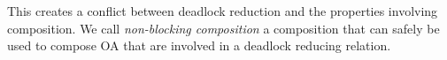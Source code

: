 \documentclass[runningheads]{llncs}
\begin{document}
This creates a conflict between deadlock reduction and the properties involving composition. 
We call \emph{non-blocking composition} a composition that can  safely be used to compose OA that are involved in a deadlock reducing relation.
\end{document}
